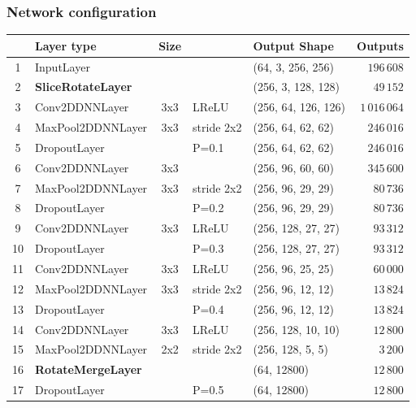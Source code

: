 \begin{frame}\frametitle{Network configuration}
\centering
\vspace{-1cm}
\begin{table}[]
\tiny
\centering
\begin{tabular}{@{}clcllr@{}}
\toprule
   & Layer type                & Size &             & Output Shape        & Outputs \\ \midrule
1  & InputLayer                &      &             & (64, 3, 256, 256)   & $196\,608$  \\
2  & \textbf{SliceRotateLayer} &      &             & (256, 3, 128, 128)  & $49\,152$   \\
3  & Conv2DDNNLayer            & 3x3  & LReLU       & (256, 64, 126, 126) & $1\,016\,064$ \\
4  & MaxPool2DDNNLayer         & 3x3  & stride 2x2  & (256, 64, 62, 62)   & $246\,016$  \\
5  & DropoutLayer              &      & P=0.1       & (256, 64, 62, 62)   & $246\,016$  \\
6  & Conv2DDNNLayer            & 3x3  &             & (256, 96, 60, 60)   & $345\,600$  \\
7  & MaxPool2DDNNLayer         & 3x3  & stride 2x2  & (256, 96, 29, 29)   & $80\,736$   \\
8  & DropoutLayer              &      & P=0.2       & (256, 96, 29, 29)   & $80\,736$   \\
9  & Conv2DDNNLayer            & 3x3  & LReLU       & (256, 128, 27, 27)  & $93\,312$   \\
10 & DropoutLayer              &      & P=0.3       & (256, 128, 27, 27)  & $93\,312$   \\
11 & Conv2DDNNLayer            & 3x3  & LReLU       & (256, 96, 25, 25)   & $60\,000$   \\
12 & MaxPool2DDNNLayer         & 3x3  & stride 2x2  & (256, 96, 12, 12)   & $13\,824$   \\
13 & DropoutLayer              &      & P=0.4       & (256, 96, 12, 12)   & $13\,824$   \\
14 & Conv2DDNNLayer            & 3x3  & LReLU       & (256, 128, 10, 10)  & $12\,800$   \\
15 & MaxPool2DDNNLayer         & 2x2  & stride 2x2  & (256, 128, 5, 5)    & $3\,200$    \\
16 & \textbf{RotateMergeLayer} &      &             & (64, 12800)         & $12\,800$   \\
17 & DropoutLayer              &      & P=0.5       & (64, 12800)         & $12\,800$   \\

\end{tabular}
\end{table}
\end{frame}
